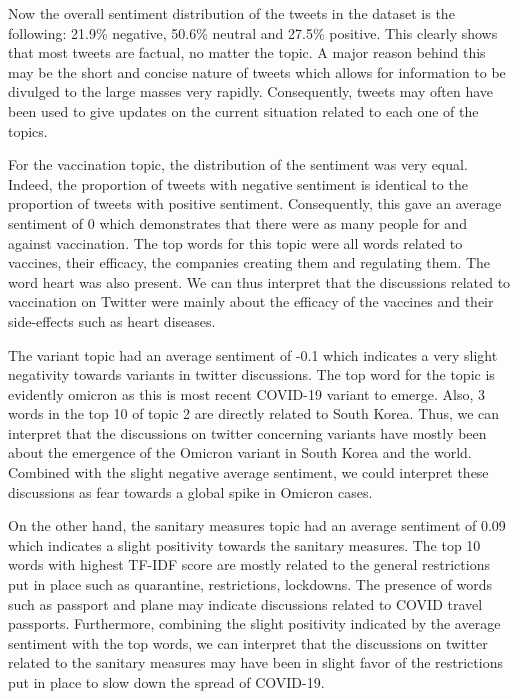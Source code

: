 \documentclass[letterpaper]{article} %
\begin{document}
Now the overall sentiment distribution of the tweets in the dataset is the following: 21.9\% negative, 50.6\% neutral and 27.5\% positive. This clearly shows that most tweets are factual, no matter the topic. A major reason behind this may be the short and concise nature of tweets which allows for information to be divulged to the large masses very rapidly. Consequently, tweets may often have been used to give updates on the current situation related to each one of the topics. 

For the vaccination topic, the distribution of the sentiment was very equal. Indeed, the proportion of tweets with negative sentiment is identical to the proportion of tweets with positive sentiment. Consequently, this gave an average sentiment of 0 which demonstrates that there were as many people for and against vaccination. The top words for this topic were all words related to vaccines, their efficacy, the companies creating them and regulating them. The word heart was also present. We can thus interpret that the discussions related to vaccination on Twitter were mainly about the efficacy of the vaccines and their side-effects such as heart diseases. 

The variant topic had an average sentiment of -0.1 which indicates a very slight negativity towards variants in twitter discussions. The top word for the topic is evidently omicron as this is most recent COVID-19 variant to emerge. Also, 3 words in the top 10 of topic 2 are directly related to South Korea. Thus, we can interpret that the discussions on twitter concerning variants have mostly been about the emergence of the Omicron variant in South Korea and the world. Combined with the slight negative average sentiment, we could interpret these discussions as fear towards a global spike in Omicron cases. 

On the other hand, the sanitary measures topic had an average sentiment of 0.09 which indicates a slight positivity towards the sanitary measures. The top 10 words with highest TF-IDF score are mostly related to the general restrictions put in place such as quarantine, restrictions, lockdowns. The presence of words such as passport and plane may indicate discussions related to COVID travel passports. Furthermore, combining the slight positivity indicated by the average sentiment with the top words, we can interpret that the discussions on twitter related to the sanitary measures may have been in slight favor of the restrictions put in place to slow down the spread of COVID-19.
\end{document}
